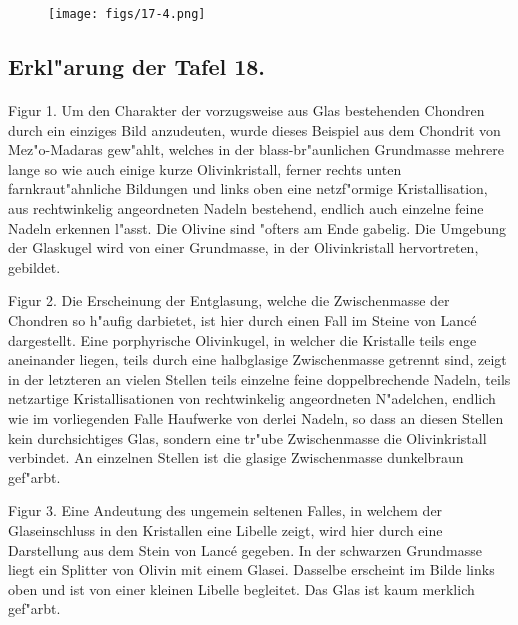 \documentclass[a4paper, 11pt, oneside, polutonikogreek, german]{article}
\begin{document}
\vspace*{\fill}
\begin{figure}[H]
\centering
\texttt{[image: figs/17-4.png]}
\caption{}
\end{figure}
\vspace*{\fill}
\clearpage

\subsection{Erkl"arung der Tafel 18.}
\paragraph{}
Figur 1. Um den Charakter der vorzugsweise aus Glas bestehenden Chondren durch ein einziges Bild anzudeuten, wurde dieses Beispiel aus dem Chondrit von Mez"o-Madaras gew"ahlt, welches in der blass-br"aunlichen Grundmasse mehrere lange so wie auch einige kurze Olivinkristall, ferner rechts unten farnkraut"ahnliche Bildungen und links oben eine netzf"ormige Kristallisation, aus rechtwinkelig angeordneten Nadeln bestehend, endlich auch einzelne feine Nadeln erkennen l"asst. Die Olivine sind "ofters am Ende gabelig. Die Umgebung der Glaskugel wird von einer Grundmasse, in der Olivinkristall hervortreten, gebildet.

Figur 2. Die Erscheinung der Entglasung, welche die Zwischenmasse der Chondren so h"aufig darbietet, ist hier durch einen Fall im Steine von Lancé dargestellt. Eine porphyrische Olivinkugel, in welcher die Kristalle teils enge aneinander liegen, teils durch eine halbglasige Zwischenmasse getrennt sind, zeigt in der letzteren an vielen Stellen teils einzelne feine doppelbrechende Nadeln, teils netzartige Kristallisationen von rechtwinkelig angeordneten N"adelchen, endlich wie im vorliegenden Falle Haufwerke von derlei Nadeln, so dass an diesen Stellen kein durchsichtiges Glas, sondern eine tr"ube Zwischenmasse die Olivinkristall verbindet. An einzelnen Stellen ist die glasige Zwischenmasse dunkelbraun gef"arbt.

Figur 3. Eine Andeutung des ungemein seltenen Falles, in welchem der Glaseinschluss in den Kristallen eine Libelle zeigt, wird hier durch eine Darstellung aus dem Stein von Lancé gegeben. In der schwarzen Grundmasse liegt ein Splitter von Olivin mit einem Glasei. Dasselbe erscheint im Bilde links oben und ist von einer kleinen Libelle begleitet. Das Glas ist kaum merklich gef"arbt.
\end{document}
